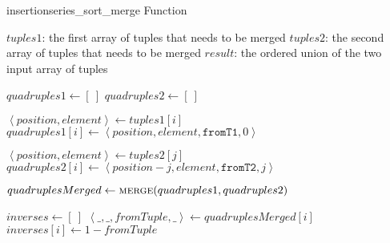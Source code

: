         \begin{frame}[containsverbatim]{\insertionseriessortmergefunctionframe}
            \begingroup
                \makeatletter
                \renewcommand{\alglinenumber}[1]{\tiny#1}
                \makeatother
                \begin{algorithm}[H]
                    \tiny
                    \caption{insertionseries\_sort\_merge Function} \label{insertionseries_sort_merge function}
                    \begin{multicols}{2}
                        \begin{algorithmic}[1]
                            \Require 
                                \Statex $tuples1$: the first array of tuples that needs to be merged
                                \Statex $tuples2$: the second array of tuples that needs to be merged
                            \Ensure
                                \Statex $result$: the ordered union of the two input array of tuples
                            \Statex
            
                                \State $quadruples1 \gets \left[\ \right]$
                                \State $quadruples2 \gets \left[\ \right]$
            
                                    \State $\left<position, element\right> \gets tuples1{\left[i\right]}$
                                    \State $quadruples1{\left[i\right]} \gets \left<position, element, \texttt{fromT1}, 0\right>$
                                \EndFor
            
                                    \State $\left<position, element\right> \gets tuples2{\left[j\right]}$
                                    \State $quadruples2{\left[i\right]} \gets \left<position - j, element, \texttt{fromT2}, j\right>$
                                \EndFor
            
                                \State $quadruplesMerged \gets \Call{merge}{quadruples1, quadruples2}$
            
                                \State $inverses \gets \left[\ \right]$
                                    \State $\left<\_, \_, fromTuple, \_\right> \gets quadruplesMerged{\left[i\right]}$
                                    \State $inverses{\left[i\right]} \gets 1 - fromTuple$
                                \EndFor
                                

\end{algorithmic}
\end{multicols}
\end{algorithm}
\end{frame}
